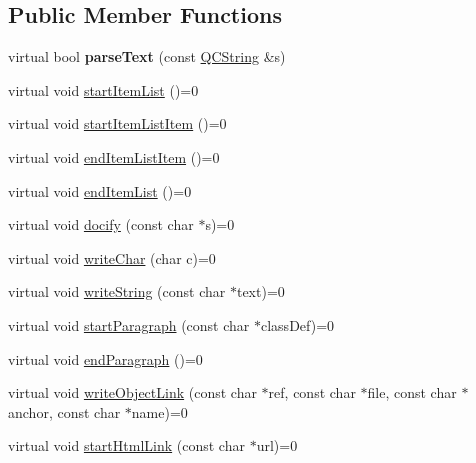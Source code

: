 \subsection*{Public Member Functions}
\begin{DoxyCompactItemize}
\item 
\mbox{\label{class_base_output_doc_interface_a26c20546f1084cdaea8c6fe1ec8de76a}} 
virtual bool {\bfseries parse\+Text} (const \mbox{\hyperlink{class_q_c_string}{Q\+C\+String}} \&s)
\item 
virtual void \mbox{\hyperlink{class_base_output_doc_interface_a54b169393594b6cf113977ccccaeb9ee}{start\+Item\+List}} ()=0
\item 
virtual void \mbox{\hyperlink{class_base_output_doc_interface_aa1cbcadfedf8e6d52029d17526b5fa3f}{start\+Item\+List\+Item}} ()=0
\item 
virtual void \mbox{\hyperlink{class_base_output_doc_interface_a90d290d7a06a9e7ecd968c8da90ed665}{end\+Item\+List\+Item}} ()=0
\item 
virtual void \mbox{\hyperlink{class_base_output_doc_interface_a3493b65672bf134033bd3bb296acdff4}{end\+Item\+List}} ()=0
\item 
virtual void \mbox{\hyperlink{class_base_output_doc_interface_ad7d3f6631bd157739170690e669b3e75}{docify}} (const char $\ast$s)=0
\item 
virtual void \mbox{\hyperlink{class_base_output_doc_interface_a1577324720c1c71142dff84ae80b058d}{write\+Char}} (char c)=0
\item 
virtual void \mbox{\hyperlink{class_base_output_doc_interface_a5737513ddf260787b5b79c84ae1059af}{write\+String}} (const char $\ast$text)=0
\item 
virtual void \mbox{\hyperlink{class_base_output_doc_interface_a9f711f4ef8f48b9c7b1cae625578e7ff}{start\+Paragraph}} (const char $\ast$class\+Def)=0
\item 
virtual void \mbox{\hyperlink{class_base_output_doc_interface_ab76280c2eb451ad160991707206b6c95}{end\+Paragraph}} ()=0
\item 
virtual void \mbox{\hyperlink{class_base_output_doc_interface_a3537423635807fe140ec5be1a2198060}{write\+Object\+Link}} (const char $\ast$ref, const char $\ast$file, const char $\ast$anchor, const char $\ast$name)=0
\item 
virtual void \mbox{\hyperlink{class_base_output_doc_interface_ab52dbf41ce337c701f9cd1e7794f80e7}{start\+Html\+Link}} (const char $\ast$url)=0
\item 

\end{DoxyCompactItemize}
